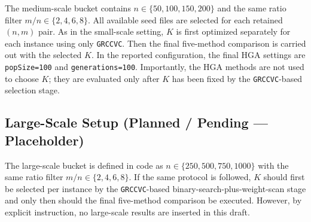 \documentclass[11pt]{article}
\begin{document}
The medium-scale bucket contains \(n\in\{50,100,150,200\}\) and the same ratio filter \(m/n\in\{2,4,6,8\}\). All available seed files are selected for each retained \((n,m)\) pair. As in the small-scale setting, \(K\) is first optimized separately for each instance using only \texttt{GRCCVC}. Then the final five-method comparison is carried out with the selected \(K\). In the reported configuration, the final HGA settings are \texttt{popSize=100} and \texttt{generations=100}. Importantly, the HGA methods are not used to choose \(K\); they are evaluated only after \(K\) has been fixed by the \texttt{GRCCVC}-based selection stage.

\subsection{Large-Scale Setup (Planned / Pending --- Placeholder)}

The large-scale bucket is defined in code as \(n\in\{250,500,750,1000\}\) with the same ratio filter \(m/n\in\{2,4,6,8\}\). If the same protocol is followed, \(K\) should first be selected per instance by the \texttt{GRCCVC}-based binary-search-plus-weight-scan stage and only then should the final five-method comparison be executed. However, by explicit instruction, no large-scale results are inserted in this draft.
\end{document}
